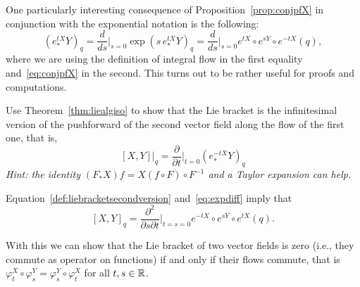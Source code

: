 \begin{remark}
  One particularly interesting consequence of Proposition~\ref{prop:conjpfX} in conjunction with the exponential notation is the following:
  \begin{equation}\label{eq:expdiff}
    \left(e_*^{tX} Y\right)_q =
    \frac{d}{ds}\Big|_{s=0} \exp\left(s\, e_*^{tX} Y\right)_q =
    \frac{d}{ds}\Big|_{s=0} e^{tX}\circ e^{sY}\circ e^{-t X}(q),
  \end{equation}
  where we are using the definition of integral flow in the first equality and~\eqref{eq:conjpfX} in the second.
  This turns out to be rather useful for proofs and computations.
\end{remark}

\begin{exercise}
  Use Theorem~\ref{thm:liealgiso} to show that the Lie bracket is the infinitesimal version of the pushforward of the second vector field along the flow of the first one, that is,
  \begin{equation}\label{def:liebracketsecondversion}
    [X,Y]\big|_q = \frac{\partial}{\partial t}\Big|_{t=0} (e_*^{-t X} Y)_q
  \end{equation}
  \textit{\small Hint: the identity $(F_* X)f = X(f\circ F)\circ F^{-1}$ and a Taylor expansion can help.}
\end{exercise}

\begin{remark}
  Equation~\eqref{def:liebracketsecondversion} and~\eqref{eq:expdiff} imply that
  \begin{equation}\label{eq:lbddr}
    [X,Y]_q = \frac{\partial^2}{\partial s \partial t}\Big|_{t=s=0}e^{-tX}\circ e^{sY}\circ e^{t X}(q).
  \end{equation}
\end{remark}

With this we can show that the Lie bracket of two vector fields is zero (i.e., they commute as operator on functions) if and only if their flows commute, that is $\varphi^X_t \circ \varphi^Y_s = \varphi^Y_s\circ \varphi^X_t$ for all $t,s\in\mathbb{R}$.

